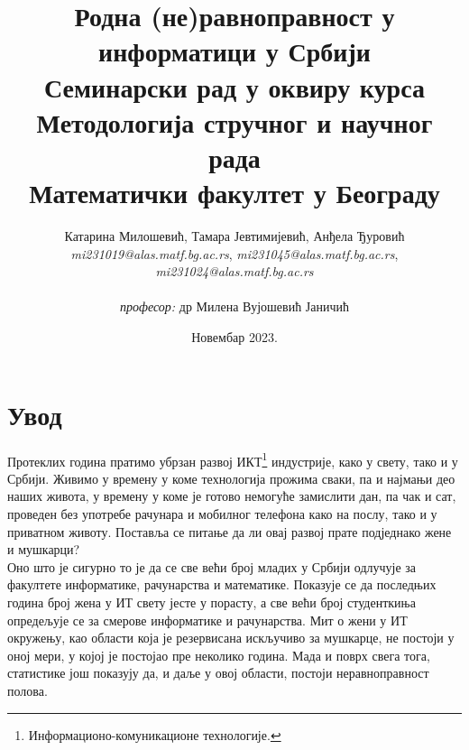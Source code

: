 \documentclass[a4paper]{article}
\begin{document}
\title{
\textbf{\LARGE{Родна (не)равноправност у информатици у Србији}}\\
\vspace{10}
\small{Семинарски рад у оквиру курса\\Методологија стручног и научног рада\\ Математички факултет у Београду}}

\author{Катарина Милошевић,  Тамара Јевтимијевић, Анђела Ђуровић \\ 
        \textit{mi231019@alas.matf.bg.ac.rs}, \textit{mi231045@alas.matf.bg.ac.rs}, 
        \textit{mi231024@alas.matf.bg.ac.rs} \\\\
        \textit{професор:} др Милена Вујошевић Јаничић}

\date{Новембар 2023.}

\maketitle
\thispagestyle{empty}

\renewcommand{\abstractname}{Сажетак}


\tableofcontents

\section{Увод}
\label{sec:uvod}

Протеклих година пратимо убрзан развој ИКТ\footnote{Информационо-комуникационе технологије.} 
индустрије, како у свету, тако и у Србији. Живимо у времену у коме технологија прожима сваки, па и
најмањи део наших живота, у времену у коме је готово немогуће замислити дан, па чак и сат, 
проведен без употребе рачунара и мобилног телефона како на послу, тако и у приватном животу. 
Поставља се питање да ли овај развој прате подједнако жене и мушкарци? \\
Оно што је сигурно то је да се све већи број младих у Србији одлучује за факултете информатике, 
рачунарства и математике. Показује се да последњих година број жена у ИТ свету јесте у порасту, а 
све већи број студенткиња опредељује се за смерове информатике и рачунарства. Мит о 
жени у ИТ окружењу, као области која је резервисана искључиво за мушкарце, не постоји у оној мери,
у којој је постојао пре неколико година. Мада и поврх свега тога, статистике још показују да, и 
даље у овој области, постоји неравноправност полова. 
\end{document}
